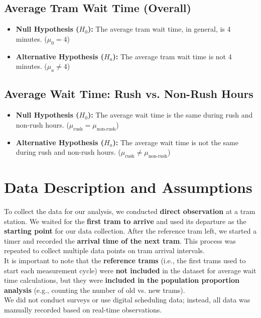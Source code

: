 \documentclass[a4paper, 10pt]{article}
\begin{document}
		\subsection{Average Tram Wait Time (Overall)}
			\label{sec:wait_time_hypothesis}
			\begin{itemize}
					\item \textbf{Null Hypothesis ($H_0$):} The average tram wait time, in general, is 4 minutes. ($\mu_0 = 4$)
					\item \textbf{Alternative Hypothesis ($H_a$):} The average tram wait time is not 4 minutes. ($\mu_a \neq 4$)
			\end{itemize}

		\subsection{Average Wait Time: Rush vs. Non-Rush Hours}
			\label{sec:wait_time_rush_non_rush_hypothesis}
			\begin{itemize}
					\item \textbf{Null Hypothesis ($H_0$):} The average wait time is the same during rush and non-rush hours. ($\mu_{\text{rush}} = \mu_{\text{non-rush}}$)
					\item \textbf{Alternative Hypothesis ($H_a$):} The average wait time is not the same during rush and non-rush hours. ($\mu_{\text{rush}} \neq \mu_{\text{non-rush}}$)
			\end{itemize}

	\section{Data Description and Assumptions}

		\begin{spacing}{1.2}
			To collect the data for our analysis, we conducted \textbf{direct observation} at a tram station. 
			\noindent We waited for the \textbf{first tram to arrive} and used its departure as the \textbf{starting point} for our data collection. 
			After the reference tram left, we started a timer and recorded the \textbf{arrival time of the next tram}. 
			This process was repeated to collect multiple data points on tram arrival intervals. \\

			\noindent It is important to note that the \textbf{reference trams} (i.e., the first trams used to start each measurement cycle) were 
			\textbf{not included} in the dataset for average wait time calculations, but they were 
			\textbf{included in the population proportion analysis} (e.g., counting the number of old vs. new trams). \\

			\noindent We did not conduct surveys or use digital scheduling data; instead, all data was manually recorded based on real-time observations.
		\end{spacing}
\end{document}
